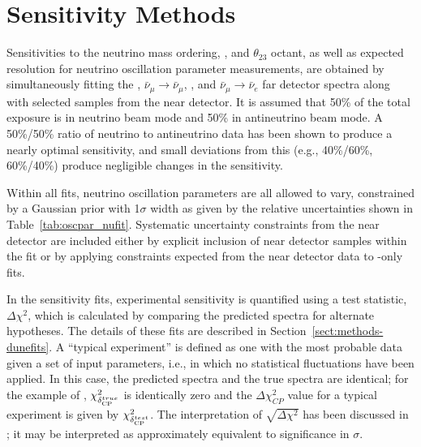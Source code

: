 \section{Sensitivity Methods}
\label{sec:physics-lbnosc-sens}




Sensitivities to the neutrino mass ordering, , and $\theta_{23}$ octant, as well as expected resolution for neutrino oscillation parameter measurements, are obtained by simultaneously fitting the \numutonumu, $\bar{\nu}_\mu \rightarrow \bar{\nu}_\mu$, \numutonue, and $\bar{\nu}_\mu \rightarrow \bar{\nu}_e$ far detector spectra along with selected samples from the near detector.  It is assumed that 50\% of the total exposure is in neutrino beam mode and 50\% in antineutrino beam mode.  A 50\%/50\% ratio of neutrino to antineutrino data has been shown to produce a nearly optimal sensitivity, and small deviations from this (e.g., 40\%/60\%, 60\%/40\%) produce negligible changes in the sensitivity. %

Within all fits, neutrino oscillation parameters are all allowed to vary, constrained by a Gaussian prior with 1$\sigma$ width as given by the relative uncertainties shown in Table~\ref{tab:oscpar_nufit}. Systematic uncertainty constraints from the near detector are included either by explicit inclusion of near detector samples within the fit or by applying constraints expected from the near detector data to -only fits.

In the sensitivity fits, experimental sensitivity is quantified using a test statistic, $\Delta\chi^2$, which is calculated by comparing the predicted spectra for alternate hypotheses.  The details of these fits are described in Section~\ref{sect:methods-dunefits}. 
A ``typical experiment'' is defined as one with the most probable data given a set of input parameters, i.e., in which no statistical fluctuations have been applied. In this case, the predicted spectra and the true spectra are identical; for the example of , $\chi^2_{\delta_{\rm CP}^{true}}$ is identically zero and the $\Delta\chi^2_{CP}$ value for a typical experiment is given by $\chi^2_{\delta_{\rm CP}^{test}}$. The interpretation of $\sqrt{\Delta\chi^2}$ has been discussed in \cite{Qian:2012zn,Blennow:2013oma}; it may be interpreted as approximately equivalent to significance in $\sigma$. 

